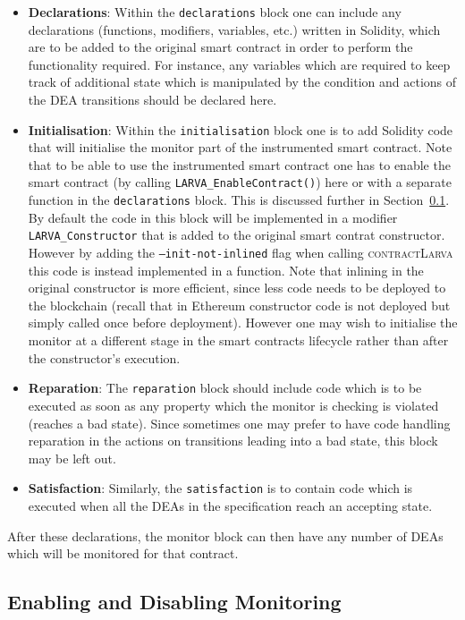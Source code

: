 \documentclass{article}
\newcommand{\contractlarva}{\textsc{contractLarva}\xspace}
\begin{document}
  \begin{itemize}
    \item \textbf{Declarations}: Within the \texttt{declarations} block one can include any declarations (functions, modifiers, variables, etc.)  written in Solidity, which are to be added to the original smart contract in order to perform the functionality required. For instance, any variables which are required to keep track of additional state which is manipulated by the condition and actions of the DEA transitions should be declared here.
    \item \textbf{Initialisation}: Within the \texttt{initialisation} block one is to add Solidity code that will initialise the monitor part of the instrumented smart contract. Note that to be able to use the instrumented smart contract one has to enable the smart contract (by calling \texttt{LARVA\_EnableContract()}) here or with a separate function in the \texttt{declarations} block. This is discussed further in Section~\ref{ss:enabling}. By default the code in this block will be implemented in a modifier \texttt{LARVA\_Constructor} that is added to the original smart contrat constructor. However by adding the \texttt{--init-not-inlined} flag when calling \contractlarva this code is instead implemented in a function. {Note that inlining in the original constructor is more efficient, since less code needs to be deployed to the blockchain (recall that in Ethereum constructor code is not deployed but simply called once before deployment). However one may wish to initialise the monitor at a different stage in the smart contracts lifecycle rather than after the constructor's execution}.
    \item \textbf{Reparation}: The \texttt{reparation} block should include code which is to be executed as soon as any property which the monitor is checking is violated (reaches a bad state). Since sometimes one may prefer to have code handling reparation in the actions on transitions leading into a bad state, this block may be left out.
    \item \textbf{Satisfaction}: Similarly, the \texttt{satisfaction} is to contain code which is executed when all the DEAs in the specification reach an accepting state.
  \end{itemize}

  After these declarations, the monitor block can then have any number of DEAs which will be monitored for that contract.
  
  \subsection{Enabling and Disabling Monitoring}\label{ss:enabling}
 
\end{document}
